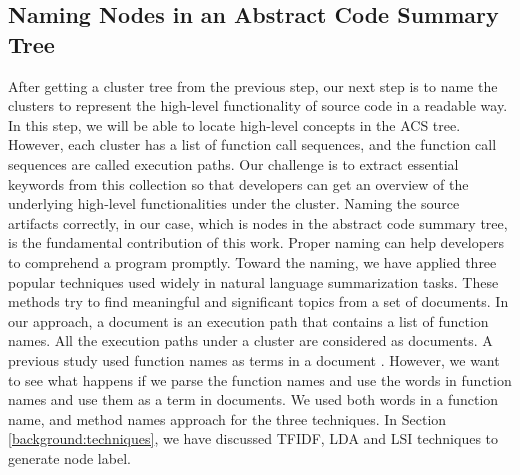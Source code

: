 \subsection{Naming Nodes in an Abstract Code Summary Tree}
\label{hla1:node_title}
After getting a cluster tree from the previous step, our next step is to name the clusters to represent the high-level functionality of source code in a readable way. In this step, we will be able to locate high-level concepts in the ACS tree. However, each cluster has a list of function call sequences, and the function call sequences are called execution paths. Our challenge is to extract essential keywords from this collection so that developers can get an overview of the underlying high-level functionalities under the cluster. Naming the source artifacts correctly, in our case, which is nodes in the abstract code summary tree, is the fundamental contribution of this work. Proper naming can help developers to comprehend a program promptly. Toward the naming, we have applied three popular techniques used widely in natural language summarization tasks. These methods try to find meaningful and significant topics from a set of documents. In our approach, a document is an execution path that contains a list of function names. All the execution paths under a cluster are considered as documents.
A previous study used function names as terms in a document \cite{gharibi2018automaticStaticCluster}. However, we want to see what happens if we parse the function names and use the words in function names and use them as a term in documents. We used both words in a function name, and method names approach for the three techniques. In Section \ref{background:techniques}, we have discussed TFIDF, LDA and LSI techniques to generate node label.


